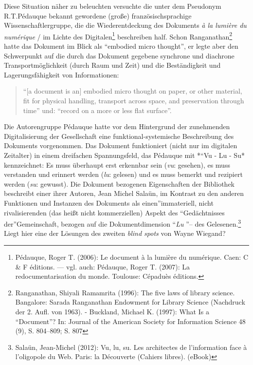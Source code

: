 Diese Situation näher zu beleuchten versuchte die unter dem Pseudonym
R.T.Pédauque bekannt gewordene (große) französischsprachige
Wissenschaftlergruppe, die die Wiederentdeckung des Dokuments \emph{à la
lumière du numérique} / im Lichte des Digitalen\footnote{Pédauque, Roger
  T. (2006): Le document à la lumière du numérique. Caen: C \& F
  éditions. --- vgl. auch: Pédauque, Roger T. (2007): La
  redocumentarisation du monde. Toulouse: Cépaduès éditions.}
beschreiben half. Schon Ranganathan\footnote{Ranganathan, Shiyali
  Ramamrita (1996): The five laws of library science. Bangalore: Sarada
  Ranganathan Endowment for Library Science (Nachdruck der 2. Aufl. von
  1963). - Buckland, Michael K. (1997): What Is a \enquote{Document}?
  In: Journal of the American Society for Information Science 48 (9), S.
  804--809; S. 807} hatte das Dokument im Blick als \enquote{embodied micro
thought}, er legte aber den Schwerpunkt auf die durch das Dokument
gegebene synchrone und diachrone Transportmöglichkeit (durch Raum und
Zeit) und die Beständigkeit und Lagerungsfähigkeit von Informationen:

\begin{quote}
\enquote{{[}a document is an{]} embodied micro thought on paper, or
other material, fit for physical handling, transport across space, and
preservation through time} und: \enquote{record on a more or less flat surface}.
\end{quote}

Die Autorengruppe Pédauque hatte vor dem Hintergrund der zunehmenden
Digitalisierung der Gesellschaft eine funktional-systemische
Beschreibung des Dokuments vorgenommen. Das Dokument funktioniert (nicht
nur im digitalen Zeitalter) in einem dreifachen Spannungsfeld, das
Pédauque mit *\enquote{Vu - Lu - Su* kennzeichnet: Es muss überhaupt
erst erkennbar sein (\emph{vu}: gesehen), es muss verstanden und
erinnert werden (\emph{lu}: gelesen) und es muss bemerkt und rezipiert
werden (\emph{su}: gewusst). Die Dokument bezogenen Eigenschaften der
Bibliothek beschreibt einer ihrer Autoren, Jean Michel Salaün, im
Kontrast zu den anderen Funktionen und Instanzen des Dokuments als
einen}immateriell, nicht rivalisierenden (das heißt nicht kommerziellen)
Aspekt des \enquote{Gedächtnisses der}Gemeinschaft, bezogen auf die
Dokumentdimension \enquote{\emph{Lu} }-- des Gelesenen.\footnote{Salaün,
  Jean-Michel (2012): Vu, lu, su. Les architectes de l'information face
  à l'oligopole du Web. Paris: la Découverte (Cahiers libres). (eBook)}
Liegt hier eine der Lösungen des zweiten \emph{blind spots} von Wayne
Wiegand?

